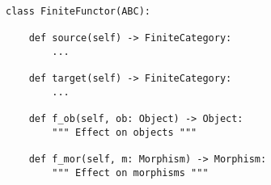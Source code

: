 \begin{verbatim}
class FiniteFunctor(ABC):

    def source(self) -> FiniteCategory:
        ...

    def target(self) -> FiniteCategory:
        ...

    def f_ob(self, ob: Object) -> Object:
        """ Effect on objects """

    def f_mor(self, m: Morphism) -> Morphism:
        """ Effect on morphisms """
\end{verbatim}